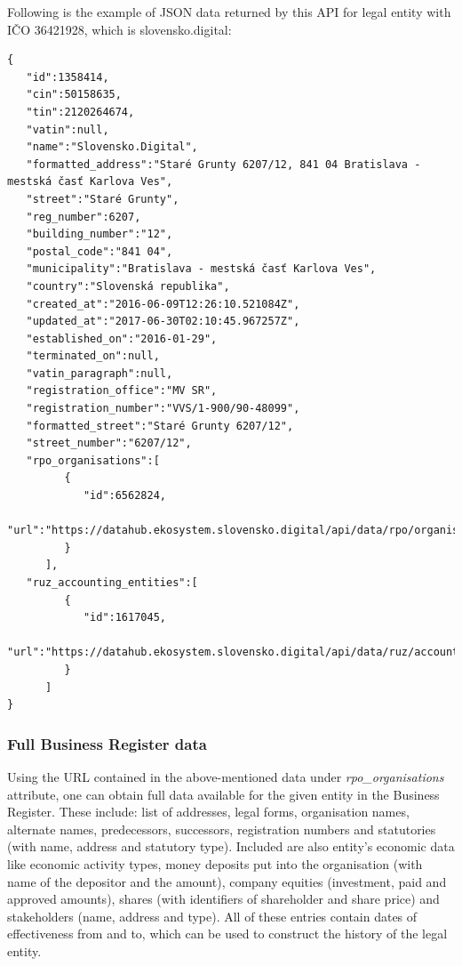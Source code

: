 \documentclass[thesis=B,english]{FITthesis}[2012/06/26]
\begin{document}
	Following is the example of JSON data returned by this API for legal entity with IČO 36421928, which is slovensko.digital:
	\newpage
\begin{lstlisting}
{
   "id":1358414,
   "cin":50158635,
   "tin":2120264674,
   "vatin":null,
   "name":"Slovensko.Digital",
   "formatted_address":"Staré Grunty 6207/12, 841 04 Bratislava - mestská časť Karlova Ves",
   "street":"Staré Grunty",
   "reg_number":6207,
   "building_number":"12",
   "postal_code":"841 04",
   "municipality":"Bratislava - mestská časť Karlova Ves",
   "country":"Slovenská republika",
   "created_at":"2016-06-09T12:26:10.521084Z",
   "updated_at":"2017-06-30T02:10:45.967257Z",
   "established_on":"2016-01-29",
   "terminated_on":null,
   "vatin_paragraph":null,
   "registration_office":"MV SR",
   "registration_number":"VVS/1-900/90-48099",
   "formatted_street":"Staré Grunty 6207/12",
   "street_number":"6207/12",
   "rpo_organisations":[
         {
            "id":6562824,
            "url":"https://datahub.ekosystem.slovensko.digital/api/data/rpo/organisations/6562824"
         }
      ],
   "ruz_accounting_entities":[
         {
            "id":1617045,
            "url":"https://datahub.ekosystem.slovensko.digital/api/data/ruz/accounting_entities/1617045"
         }
      ]
}
\end{lstlisting}

\subsubsection{Full Business Register data}
	Using the URL contained in the above-mentioned data under \emph{rpo\_organisations} attribute, one can obtain full data available for the given entity in the Business Register. These include: list of addresses, legal forms, organisation names, alternate names, predecessors, successors, registration numbers and statutories (with name, address and statutory type). Included are also entity's economic data like economic activity types, money deposits put into the organisation (with name of the depositor and the amount), company equities (investment, paid and approved amounts), shares (with identifiers of shareholder and share price) and stakeholders (name, address and type). All of these entries contain dates of effectiveness from and to, which can be used to construct the history of the legal entity.
\end{document}

